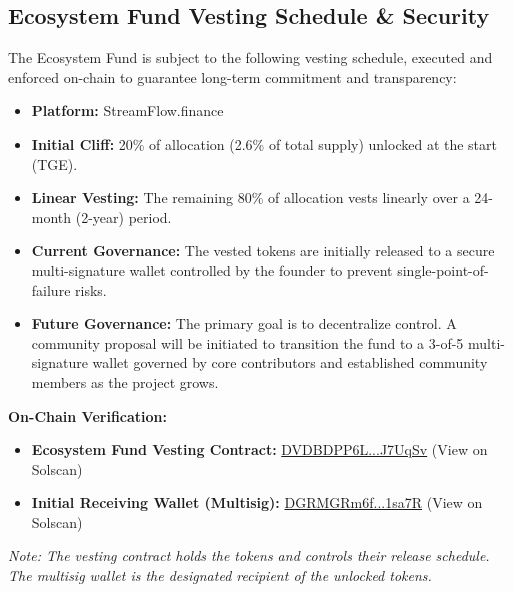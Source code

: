\documentclass{article}
\begin{document}
\begin{tcolorbox}[colback=headerColor!10!white, colframe=headerColor, boxrule=2pt, width=\textwidth, arc=6mm, left=8mm, right=8mm, top=6mm, bottom=6mm]
\subsection[
  \texorpdfstring{\color{primaryColor}Ecosystem Fund Vesting Schedule \& Security}{Ecosystem Fund Vesting Schedule \& Security}
]{\color{primaryColor}Ecosystem Fund Vesting Schedule \& Security}
\label{subsec:Ecosystem} 
The Ecosystem Fund is subject to the following vesting schedule, executed and enforced on-chain to guarantee long-term commitment and transparency:
\begin{itemize}
    \item \textbf{Platform:} StreamFlow.finance
    \item \textbf{Initial Cliff:} 20\% of allocation (2.6\% of total supply) unlocked at the start (TGE).
    \item \textbf{Linear Vesting:} The remaining 80\% of allocation vests linearly over a 24-month (2-year) period.
    \item \textbf{Current Governance:} The vested tokens are initially released to a secure multi-signature wallet controlled by the founder to prevent single-point-of-failure risks.
    \item \textbf{Future Governance:} The primary goal is to decentralize control. A community proposal will be initiated to transition the fund to a 3-of-5 multi-signature wallet governed by core contributors and established community members as the project grows.
\end{itemize}

\textbf{On-Chain Verification:}
\begin{itemize}
    \item \textbf{Ecosystem Fund Vesting Contract:} 
          \href{https://solscan.io/account/DVDBDPP6LpcBFRQWKDJU8L1QcQ7HXrVAg9j7dCJ7UqSv}{DVDBDPP6L...J7UqSv} (View on Solscan)
    
    \item \textbf{Initial Receiving Wallet (Multisig):} 
          \href{https://solscan.io/account/DGRMGRm6fWLs53ghWR7RFJ1JC8UvcKWQP9LtunQ1sa7R}{DGRMGRm6f...1sa7R} (View on Solscan)
\end{itemize}

\noindent\textit{Note: The vesting contract holds the tokens and controls their release schedule. The multisig wallet is the designated recipient of the unlocked tokens.}


\end{tcolorbox}
\end{document}
